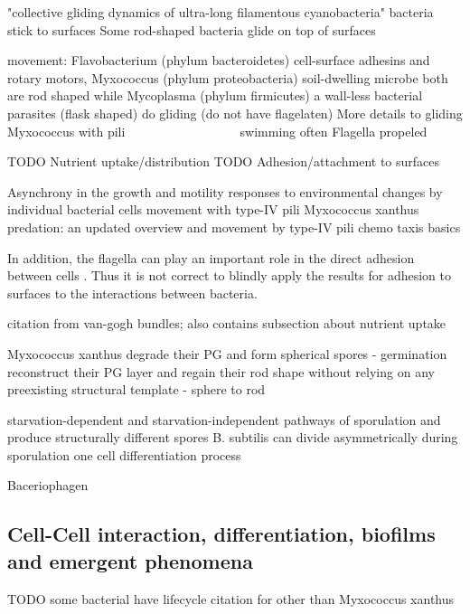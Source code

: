 \documentclass{article}
\newcommand{\todo}[1]{\colorbox{WildStrawberry}{\textcolor{white}{#1}}}
\begin{document}
\cite{Moreau2018} "collective gliding dynamics of ultra-long filamentous cyanobacteria"
\cite{BrettFinlay2014} bacteria stick to surfaces
\cite{Shah2022} Some rod-shaped bacteria glide on top of surfaces

movement:
Flavobacterium (phylum bacteroidetes) cell-surface adhesins and rotary motors, Myxococcus (phylum proteobacteria) soil-dwelling microbe both are rod shaped while Mycoplasma (phylum firmicutes) a wall-less bacterial parasites (flask shaped) do gliding (do not have flagelaten) \cite{Shrivastava2015}
More details to gliding Myxococcus with pili \todo{@Toqi find citation}
swimming \cite{Kong2014} often Flagella propeled \cite{Harshey2015}

TODO Nutrient uptake/distribution
TODO Adhesion/attachment to surfaces


Asynchrony in the growth and motility responses to environmental changes by individual bacterial cells \cite{Senkei2007}
movement with type-IV pili \cite{Ellison2021}
Myxococcus xanthus predation: an updated overview and movement by type-IV pili \cite{ContrerasM2024}
chemo taxis basics \cite{Nikita2009}

In addition, the flagella can play an important role in the direct adhesion between cells \cite{Haiko2013}. Thus it is not correct to blindly apply the results for adhesion to surfaces to the interactions between bacteria.

\cite{Li2025} citation from van-gogh bundles; also contains subsection about nutrient uptake

Myxococcus xanthus degrade their PG and form spherical spores - germination reconstruct their PG layer and regain their rod shape without relying on any preexisting structural template - sphere to rod \cite{Huan2021}

starvation-dependent and starvation-independent pathways of sporulation and produce structurally different spores \cite{Licking2000}
B. subtilis can divide asymmetrically during sporulation one cell differentiation process \cite{Barák2019}

Baceriophagen \cite{Duckworth2002}

\subsection{Cell-Cell interaction, differentiation, biofilms and emergent phenomena} %

TODO some bacterial have lifecycle citation for other than Myxococcus xanthus 
\end{document}
